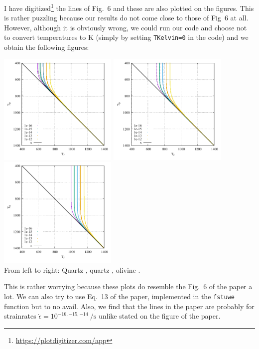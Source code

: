 I have digitized\footnote{\url{https://plotdigitizer.com/app}} the lines of Fig.~6
and these are also plotted on the figures.
This is rather puzzling because our results do not come close to those of Fig~6 at all. 
However, although it is obviously wrong, we could run our code and choose not 
to convert temperatures to \si{\kelvin} (simply by setting \lstinline|TKelvin=0| in the code) 
and we obtain the following figures:

\begin{center}
\includegraphics[width=5.7cm]{python_codes/fieldstone_167/1zero/fig6.pdf}
\includegraphics[width=5.7cm]{python_codes/fieldstone_167/2zero/fig6.pdf}
\includegraphics[width=5.7cm]{python_codes/fieldstone_167/3zero/fig6.pdf}\\
{\captionfont From left to right: Quartz \cite{brko80}, quartz \cite{stsa94}, olivine \cite{brko80}.}
\end{center}

This is rather worrying because these plots do resemble the Fig.~6 of the paper a lot.
We can also try to use Eq.~13 of the paper, implemented in the \lstinline|fstuwe|
function but to no avail.
Also, we find that the lines in the paper are probably for strainrates 
$\dot{\epsilon}=10^{-16,-15,-14}~\si{\per\second}$ unlike stated on the figure of the paper.








